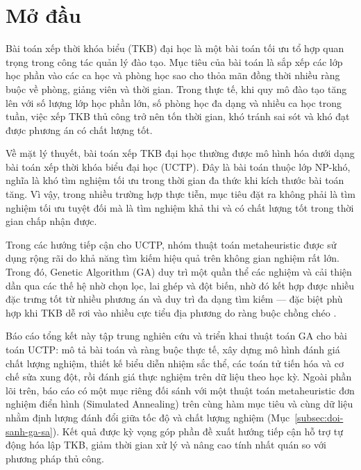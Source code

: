 \documentclass[a4paper,12pt,oneside]{article}
\begin{document}
	\clearpage
	
	\setcounter{page}{1}
	
	\section*{Mở đầu}
	
	Bài toán xếp thời khóa biểu (TKB) đại học là một bài toán tối ưu tổ hợp quan trọng trong công tác quản lý đào tạo. Mục tiêu của bài toán là sắp xếp các lớp học phần vào các ca học và phòng học sao cho thỏa mãn đồng thời nhiều ràng buộc về phòng, giảng viên và thời gian. Trong thực tế, khi quy mô đào tạo tăng lên với số lượng lớp học phần lớn, số phòng học đa dạng và nhiều ca học trong tuần, việc xếp TKB thủ công trở nên tốn thời gian, khó tránh sai sót và khó đạt được phương án có chất lượng tốt.
	
	Về mặt lý thuyết, bài toán xếp TKB đại học thường được mô hình hóa dưới dạng bài toán xếp thời khóa biểu đại học (UCTP). Đây là bài toán thuộc lớp NP-khó, nghĩa là khó tìm nghiệm tối ưu trong thời gian đa thức khi kích thước bài toán tăng. Vì vậy, trong nhiều trường hợp thực tiễn, mục tiêu đặt ra không phải là tìm nghiệm tối ưu tuyệt đối mà là tìm nghiệm khả thi và có chất lượng tốt trong thời gian chấp nhận được.
	
	Trong các hướng tiếp cận cho UCTP, nhóm thuật toán metaheuristic được sử dụng rộng rãi do khả năng tìm kiếm hiệu quả trên không gian nghiệm rất lớn. Trong đó, Genetic Algorithm (GA) duy trì một quần thể các nghiệm và cải thiện dần qua các thế hệ nhờ chọn lọc, lai ghép và đột biến, nhờ đó kết hợp được nhiều đặc trưng tốt từ nhiều phương án và duy trì đa dạng tìm kiếm --- đặc biệt phù hợp khi TKB dễ rơi vào nhiều cực tiểu địa phương do ràng buộc chồng chéo \cite{goldberg1989genetic,eiben2015introduction,burke1997automated}.
	
	Báo cáo tổng kết này tập trung nghiên cứu và triển khai thuật toán GA cho bài toán UCTP: mô tả bài toán và ràng buộc thực tế, xây dựng mô hình đánh giá chất lượng nghiệm, thiết kế biểu diễn nhiệm sắc thể, các toán tử tiến hóa và cơ chế sửa xung đột, rồi đánh giá thực nghiệm trên dữ liệu theo học kỳ. Ngoài phần lõi trên, báo cáo có một mục riêng đối sánh với một thuật toán metaheuristic đơn nghiệm điển hình (Simulated Annealing) trên cùng hàm mục tiêu và cùng dữ liệu nhằm định lượng đánh đổi giữa tốc độ và chất lượng nghiệm (Mục~\ref{subsec:doi-sanh-ga-sa}). Kết quả được kỳ vọng góp phần đề xuất hướng tiếp cận hỗ trợ tự động hóa lập TKB, giảm thời gian xử lý và nâng cao tính nhất quán so với phương pháp thủ công.
	
\end{document}
